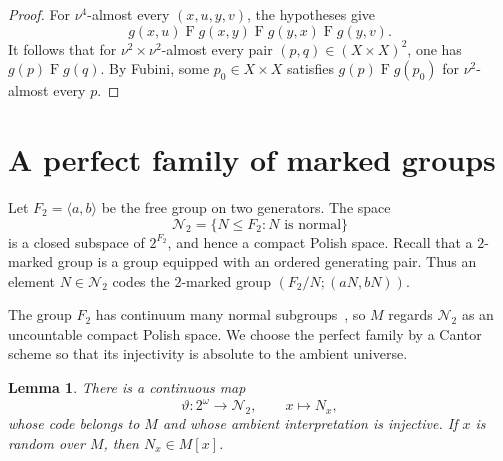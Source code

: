 \documentclass[11pt]{amsart}
\newtheorem{lemma}[theorem]{Lemma}
\theoremstyle{definition}
\theoremstyle{remark}
\begin{document}
\begin{proof}
For $\nu^4$-almost every $(x,u,y,v)$, the hypotheses give
\[
 g(x,u)\mathrel{F}g(x,y)
 \mathrel{F}g(y,x)
 \mathrel{F}g(y,v).
\]
It follows that for $\nu^2\times\nu^2$-almost every pair $(p,q)\in(X\times X)^2$, one has $g(p)\mathrel{F}g(q)$.  By Fubini, some $p_0\in X\times X$ satisfies $g(p)\mathrel{F}g(p_0)$ for $\nu^2$-almost every $p$.
\end{proof}

\section{A perfect family of marked groups}

Let $F_2=\langle a,b\rangle$ be the free group on two generators.  The space
\[
 \mathcal N_2=\{N\leq F_2:N\text{ is normal}\}
\]
is a closed subspace of $2^{F_2}$, and hence a compact Polish space.  Recall that a $2$-marked group is a group equipped with an ordered generating pair.  Thus an element $N\in\mathcal N_2$ codes the $2$-marked group $(F_2/N;(aN,bN))$.

The group $F_2$ has continuum many normal subgroups~\cite[III.C.40]{deLaHarpe}, so $M$ regards $\mathcal N_2$ as an uncountable compact Polish space.  We choose the perfect family by a Cantor scheme so that its injectivity is absolute to the ambient universe.

\begin{lemma}\label{lem:absolute-perfect-family}
There is a continuous map
\[
 \vartheta\colon2^\omega\longrightarrow\mathcal N_2,
 \qquad x\longmapsto N_x,
\]
whose code belongs to $M$ and whose ambient interpretation is injective.  If $x$ is random over $M$, then $N_x\in M[x]$.
\end{lemma}
\end{document}
